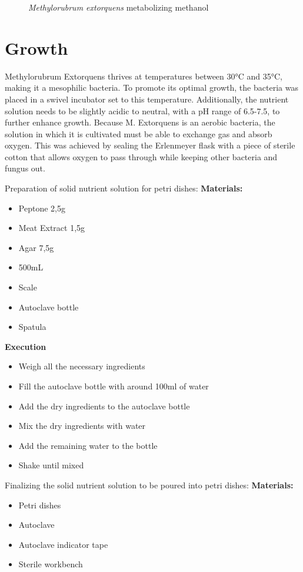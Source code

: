 \begin{enumerate}
\begin{figure}[H]
        \caption{\emph{Methylorubrum extorquens} metabolizing methanol}
        \label{fig:mextorquens_metabolizing_methanol}
    \end{figure}
\end{enumerate}


\section{Growth}
Methylorubrum Extorquens thrives at temperatures between 30°C and 35°C, making it a
mesophilic bacteria. To promote its optimal growth, the bacteria was placed in a swivel
incubator set to this temperature. Additionally, the nutrient solution needs to be slightly
acidic to neutral, with a pH range of 6.5-7.5, to further enhance growth. Because M.
Extorquens is an aerobic bacteria, the solution in which it is cultivated must be able to
exchange gas and absorb oxygen. This was achieved by sealing the Erlenmeyer flask with
a piece of sterile cotton that allows oxygen to pass through while keeping other bacteria
and fungus out.

Preparation of solid nutrient solution for petri dishes:
\textbf{Materials:}
\begin{itemize}
    \item Peptone 2,5g
    \item Meat Extract 1,5g
    \item Agar 7,5g
    \item {} 500mL
    \item Scale
    \item Autoclave bottle
    \item Spatula
\end{itemize}

\textbf{Execution}
\begin{itemize}
    \item Weigh all the necessary ingredients
    \item Fill the autoclave bottle with around 100ml of water
    \item Add the dry ingredients to the autoclave bottle
    \item Mix the dry ingredients with water
    \item Add the remaining water to the bottle
    \item Shake until mixed
\end{itemize}

Finalizing the solid nutrient solution to be poured into petri dishes:
\textbf{Materials:}
\begin{itemize}
    \item Petri dishes
    \item Autoclave
    \item Autoclave indicator tape
    \item Sterile workbench
\end{itemize}

